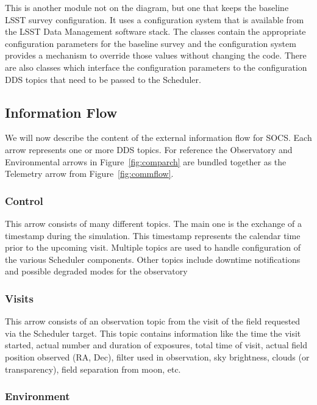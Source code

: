 \documentclass[]{spie}  %
\begin{document}
This is another module not on the diagram, but one that keeps the baseline LSST survey configuration. It uses a configuration system that is available from the LSST Data Management software stack\cite{2016_adassxxv_O3-1}. The classes contain the appropriate configuration parameters for the baseline survey and the configuration system provides a mechanism to override those values without changing the code. There are also classes which interface the configuration parameters to the configuration DDS topics that need to be passed to the Scheduler.

\subsection{Information Flow}

We will now describe the content of the external information flow for SOCS. Each arrow represents one or more DDS topics. For reference the Observatory and Environmental arrows in Figure~\ref{fig:comparch} are bundled together as the Telemetry arrow from Figure~\ref{fig:commflow}.

\subsubsection{Control}

This arrow consists of many different topics. The main one is the exchange of a timestamp during the simulation. This timestamp represents the calendar time prior to the upcoming visit. Multiple topics are used to handle configuration of the various Scheduler components. Other topics include downtime notifications and possible degraded modes for the observatory

\subsubsection{Visits}

This arrow consists of an observation topic from the visit of the field requested via the Scheduler target. This topic contains information like the time the visit started, actual number and duration of exposures, total time of visit, actual field position observed (RA, Dec), filter used in observation, sky brightness, clouds (or transparency), field separation from moon, etc.

\subsubsection{Environment}
\end{document}
